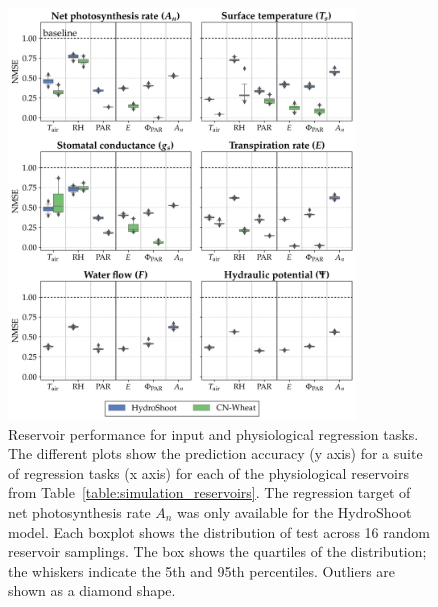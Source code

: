 \begin{figure}[hp]
	\centering
    \includegraphics[width=0.82\textwidth]{img/regression_res_perf.png}
	\caption[Reservoir performance for input and physiological regression tasks.]
	        {Reservoir performance for input and physiological regression tasks.
	         The different plots show the prediction accuracy (y axis) for a suite of regression tasks (x axis) for each of the physiological reservoirs from \mbox{Table \ref{table:simulation_reservoirs}}.
	         The regression target of net photosynthesis rate  $A_n$ was only available for the HydroShoot model.
	         Each boxplot shows the distribution of test across 16 random reservoir samplings.
	         The box shows the quartiles of the distribution; the whiskers indicate the 5th and 95th percentiles.
	         Outliers are shown as a diamond shape.}
	\label{fig:input-phys-scores}
\end{figure}

